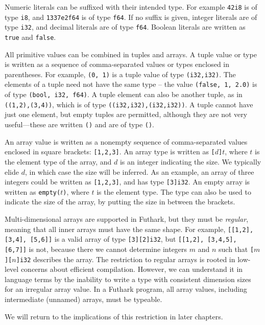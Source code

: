 \documentclass[oneside,11pt]{book}
\begin{document}
Numeric literals can be suffixed with their intended type.  For
example \texttt{42i8} is of type \texttt{i8}, and \texttt{1337e2f64}
is of type \texttt{f64}.  If no suffix is given, integer literals are
of type \texttt{i32}, and decimal literals are of type \texttt{f64}.
Boolean literals are written as \texttt{true} and \texttt{false}.

All primitive values can be combined in tuples and arrays.  A tuple
value or type is written as a sequence of comma-separated values or
types enclosed in parentheses.  For example, \texttt{(0, 1)} is a
tuple value of type \texttt{(i32,i32)}.  The elements of a tuple need
not have the same type -- the value \texttt{(false, 1, 2.0)} is of
type \texttt{(bool, i32, f64)}.  A tuple element can also be another
tuple, as in \texttt{((1,2),(3,4))}, which is of type
\texttt{((i32,i32),(i32,i32))}.  A tuple cannot have just one element,
but empty tuples are permitted, although they are not very useful---these are
written \texttt{()} and are of type \texttt{()}.

An array value is written as a nonempty sequence of comma-separated
values enclosed in square brackets: \texttt{[1,2,3]}.  An array type
is written as \texttt{[$d$]$t$}, where \texttt{$t$} is the element
type of the array, and $d$ is an integer indicating the size.  We
typically elide $d$, in which case the size will be inferred.  As an
example, an array of three integers could be written as
\texttt{[1,2,3]}, and has type \texttt{[3]i32}.  An empty array is
written as \texttt{empty($t$)}, where \texttt{$t$} is the element
type.  The type can also be used to indicate the size of the array, by
putting the size in between the brackets.

Multi-dimensional arrays are supported in Futhark, but they must be
\textit{regular}, meaning that all inner arrays must have the same
shape.  For example, \texttt{[[1,2], [3,4], [5,6]]} is a valid array
of type \texttt{[3][2]i32}, but \texttt{[[1,2], [3,4,5], [6,7]]} is
not, because there we cannot determine integers $m$ and $n$ such that
\texttt{[$m$][$n$]i32} describes the array.  The restriction to
regular arrays is rooted in low-level concerns about efficient
compilation.  However, we can understand it in language terms by the
inability to write a type with consistent dimension sizes for an
irregular array value.  In a Futhark program, all array values,
including intermediate (unnamed) arrays, must be typeable.

We will return to the implications of this restriction in later
chapters.
\end{document}

